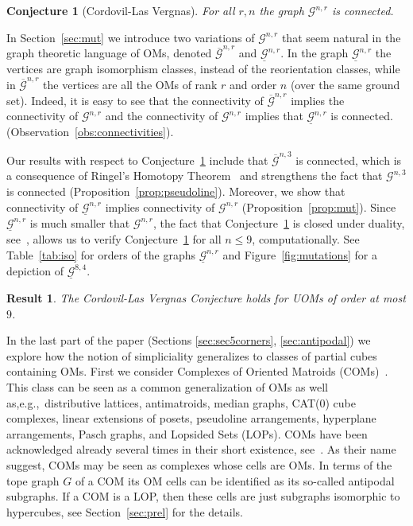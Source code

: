 \documentclass[final,11pt]{article}
\newtheorem{conj}{Conjecture}%
\newtheorem{thmintro}{Result}%
\begin{document}
\begin{conj}[Cordovil-Las Vergnas]\label{conj:cordovil}
For all $r,n$ the graph $\mathcal{G}^{n,r}$ is connected.
\end{conj}


In Section~\ref{sec:mut} we introduce two variations of $\mathcal{G}^{n,r}$ that seem natural in the graph theoretic language of OMs, denoted $\overline{\mathcal{G}}^{n,r}$ and $\underline{\mathcal{G}}^{n,r}$. In the graph $\underline{\mathcal{G}}^{n,r}$ the vertices are graph isomorphism classes, instead of the reorientation classes, while in $\overline{\mathcal{G}}^{n,r}$ the vertices are all the OMs of rank $r$ and order $n$ (over the same ground set). Indeed, it is easy to see that the connectivity of $\overline{\mathcal{G}}^{n,r}$ implies the connectivity of $\mathcal{G}^{n,r}$ and the connectivity of $\mathcal{G}^{n,r}$ implies that $\underline{\mathcal{G}}^{n,r}$ is  connected. (Observation~\ref{obs:connectivities}).  

Our results with respect to Conjecture~\ref{conj:cordovil} include that $\overline{\mathcal{G}}^{n,3}$ is connected, which is a consequence of Ringel's Homotopy Theorem~\cite{Rin-56,Rin-57} and strengthens the fact that $\mathcal{G}^{n,3}$ is connected (Proposition~\ref{prop:pseudoline}). Moreover, we show that connectivity of $\underline{\mathcal{G}}^{n,r}$ implies connectivity of $\mathcal{G}^{n,r}$ (Proposition~\ref{prop:mut}). Since $\underline{\mathcal{G}}^{n,r}$ is much smaller that $\mathcal{G}^{n,r}$, the fact that Conjecture~\ref{conj:cordovil} is closed under duality, see~\cite[Exercise 7.9]{bjvestwhzi-93}, allows us to verify Conjecture~\ref{conj:cordovil} for all $n\leq 9$, computationally. 
See Table~\ref{tab:iso} for orders of the graphs $\underline{\mathcal{G}}^{n,r}$ and Figure~\ref{fig:mutations} for a depiction of $\underline{\mathcal{G}}^{8,4}$.

\begin{thmintro}
The Cordovil-Las Vergnas Conjecture holds for UOMs of order at most $9$.
\end{thmintro}

In the last part of the paper (Sections \ref{sec:sec5corners}, \ref{sec:antipodal}) we explore how the notion of simpliciality generalizes to classes of partial cubes containing OMs.
First we consider Complexes of Oriented Matroids (COMs)~\cite{Ban-18}. This class can be seen as a common generalization of OMs as well as,e.g.,~distributive lattices, antimatroids, median graphs, CAT(0) cube complexes, linear extensions of posets, pseudoline arrangements, hyperplane arrangements, Pasch graphs, and Lopsided Sets (LOPs). COMs have been acknowledged already several times in their short existence, see~\cite{margolis2015cell,itskov2018hyperplane,Bau-16,alex2020oriented,DKR21,padrol2021sweeps,R20,Hoch-19}. As their name suggest, COMs may be seen as complexes whose cells are OMs. In terms of the tope graph $G$ of a COM its OM cells can be identified as its so-called antipodal subgraphs. If a COM is a LOP, then these cells are just subgraphs isomorphic to hypercubes, see Section~\ref{sec:prel} for the details.
\end{document}
